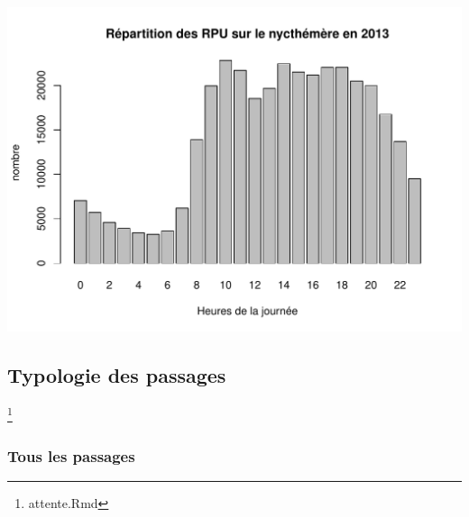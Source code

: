 \documentclass[12pt,english,french,twoside]{book}\usepackage[]{graphicx}\usepackage[]{color}
\makeatletter
\def\maxwidth{ %
  \ifdim\Gin@nat@width>\linewidth
    \linewidth
  \else
    \Gin@nat@width
  \fi
}
\newenvironment{knitrout}{}{} %
\makeatother
\begin{document}
\begin{center}
\begin{knitrout}
\color{fgcolor}
\includegraphics[width=\maxwidth]{figure/bp_activite_heure} 

\end{knitrout}

\label{fig:activite_heure}
\end{center}

\subsection{Typologie des passages} \footnote{attente.Rmd}


\subsubsection*{Tous les passages}

 
\end{document}
